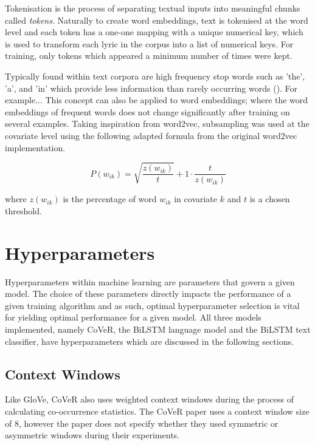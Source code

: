 \noindent
\newline
Tokenisation is the process of separating textual inputs into meaningful chunks called \textit{tokens}. Naturally to create word embeddings, text is tokenised at the word level and each token has a one-one mapping with a unique numerical key, which is used to transform each lyric in the corpus into a list of numerical keys. For training, only tokens which appeared a minimum number of times were kept.
 
\noindent
\newline
Typically found within text corpora are high frequency stop words such as 'the', 'a', and 'in' which provide less information than rarely occurring words (\cite{Mikolov2013a}). For example... This concept can also be applied to word embeddings; where the word embeddings of frequent words does not change significantly after training on several examples. Taking inspiration from word2vec, subsampling was used at the covariate level using the following adapted formula from the original word2vec implementation.

\begin{equation}
P(w_{ik}) = \sqrt{\dfrac{z(w_{ik})}{t}} + 1 \cdot \dfrac{t}{z(w_{ik})}
\end{equation}

\noindent
\newline
where \(z(w_{ik})\) is the percentage of word \(w_{ik}\) in covariate \(k\) and \(t\) is a chosen threshold.

\section{Hyperparameters}
Hyperparameters within machine learning are parameters that govern a given model. The choice of these parameters directly impacts the performance of a given training algorithm and as such, optimal hyperparameter selection is vital for yielding optimal performance for a given model. All three models implemented, namely CoVeR, the BiLSTM language model and the BiLSTM text classifier, have hyperparameters which are discussed in the following sections.
\subsection{Context Windows}
Like GloVe, CoVeR also uses weighted context windows during the process of calculating co-occurrence statistics. The CoVeR paper uses a context window size of 8, however the paper does not specify whether they used symmetric or asymmetric windows during their experiments.  
